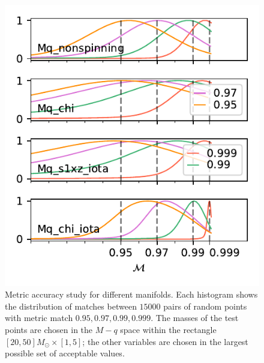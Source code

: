 \documentclass[twocolumn,showpacs,preprintnumbers,nofootinbib,prd,
superscriptaddress,10pt]{revtex4-2}
\begin{document}
\begin{figure}[t]
	\centering
	\includegraphics{metric_accuracy_hessian}
	\caption{Metric accuracy study for different manifolds.
	Each histogram shows the distribution of matches between $15000$ pairs of random points with metric match $0.95, 0.97, 0.99, 0.999$. The masses of the test points are chosen in the $M-q$ space within the rectangle ${[20, 50] M_\odot \times [1,5]}$; the other variables are chosen in the largest possible set of acceptable values.}
	\label{fig:metric_accuracy}
\end{figure}
\end{document}
